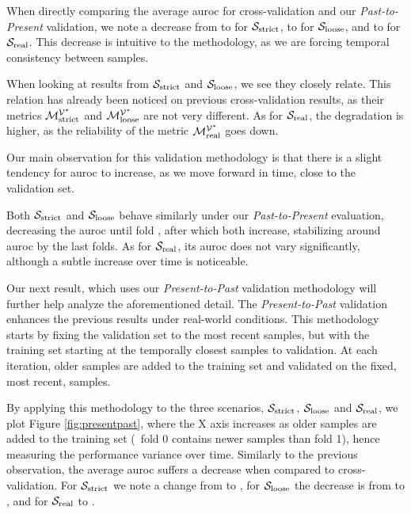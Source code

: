 When directly comparing the average \gls{auroc} for cross-validation and our \textit{Past-to-Present} validation, we note a decrease from  to  for $\mathcal{S}_{\mathrm{strict}}$,  to  for $\mathcal{S}_{\mathrm{loose}}$, and  to  for $\mathcal{S}_{\mathrm{real}}$.
This decrease is intuitive to the methodology, as we are forcing temporal consistency between samples.

When looking at results from $\mathcal{S}_{\mathrm{strict}}$ and $\mathcal{S}_{\mathrm{loose}}$, we see they closely relate.
This relation has already been noticed on previous cross-validation results, as their metrics $\mathcal{M}_{\mathrm{strict}}^{\mathcal{V}^*}$ and $\mathcal{M}_{\mathrm{loose}}^{\mathcal{V}^*}$ are not very different.
As for $\mathcal{S}_{\mathrm{real}}$, the degradation is higher, as the reliability of the metric $\mathcal{M}_{\mathrm{real}}^{\mathcal{V}^*}$ goes down.

Our main observation for this validation methodology is that there is a slight tendency for \gls{auroc} to increase, as we move forward in time, close to the validation set.

Both $\mathcal{S}_{\mathrm{strict}}$ and $\mathcal{S}_{\mathrm{loose}}$ behave similarly under our \textit{Past-to-Present} evaluation, decreasing the \gls{auroc} until fold , after which both increase, stabilizing around  \gls{auroc} by the last  folds. As for $\mathcal{S}_{\mathrm{real}}$, its \gls{auroc} does not vary significantly, although a subtle increase over time is noticeable.

\medskip

Our next result, which uses our \textit{Present-to-Past} validation methodology will further help analyze the aforementioned detail.
The \textit{Present-to-Past} validation enhances the previous results under real-world conditions.
This methodology starts by fixing the validation set to the most recent samples, but with the training set starting at the temporally closest samples to validation.
At each iteration, older samples are added to the training set and validated on the fixed, most recent, samples.

By applying this methodology to the three scenarios, $\mathcal{S}_{\mathrm{strict}}$, $\mathcal{S}_{\mathrm{loose}}$ and $\mathcal{S}_{\mathrm{real}}$, we plot Figure \ref{fig:presentpast}, where the X axis increases as older samples are added to the training set (\ie\ fold 0 contains newer samples than fold 1), hence measuring the performance variance over time.
Similarly to the previous observation, the average \gls{auroc} suffers a decrease when compared to cross-validation. For $\mathcal{S}_{\mathrm{strict}}$ we note a change from  to , for $\mathcal{S}_{\mathrm{loose}}$ the decrease is from  to , and for $\mathcal{S}_{\mathrm{real}}$  to .

